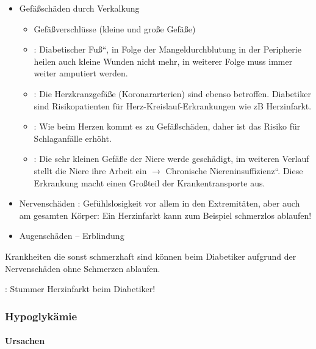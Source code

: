 \begin{itemize}
    \item {\mdseries
    Gefäßschäden durch Verkalkung}
    
    \begin{itemize}
        \item Gefäßverschlüsse (kleine und große Gefäße)
        \item {}: {\quotedblbase}Diabetischer
        Fuß{\textquotedblleft}, in Folge der Mangeldurchblutung in der Peripherie heilen auch kleine
        Wunden nicht mehr, in weiterer Folge muss immer weiter amputiert
        werden.
        \item {}: Die Herzkranzgefäße
        (Koronar\-arterien) sind ebenso betroffen. Diabetiker sind Risikopatienten für
        Herz-Kreislauf-Erkrankungen wie zB Herz\-infarkt.
        \item {}: Wie beim Herzen kommt es zu
        Gefäßschäden, daher ist das Risiko für
        Schlaganfälle erhöht.
        \item {}: Die sehr kleinen Gefäße der
        Niere werde geschädigt, im weiteren Verlauf stellt die Niere ihre Arbeit ein
        ${\rightarrow}$ {\quotedblbase}Chronische
        Niereninsuffizienz{\textquotedblleft}. Diese Erkrankung macht einen
        Großteil der Krankentransporte aus.
    \end{itemize}
    \item {\mdseries
    Nervenschäden :
    Gefühlslosigkeit vor allem in den Extremitäten, aber auch am
    gesamten Körper: Ein Herzinfarkt kann zum Beispiel schmerzlos
    ablaufen!}
    
    \item {\mdseries
    Augenschäden -- Erblindung}
    
\end{itemize}

Krankheiten die sonst schmerzhaft sind können beim Diabetiker aufgrund
der Nervenschäden ohne Schmerzen ablaufen. 

: Stummer Herzinfarkt beim Diabetiker!





\subsubsection{Hypoglykämie}

\paragraph{Ursachen} ~



